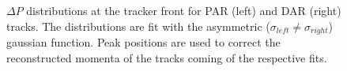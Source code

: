 \begin{figure}

\caption{
  \label{fig:sindrum_ii_fig_08_fit} 
  $\Delta P$ distributions at the tracker front for PAR (left) and DAR (right) tracks. The distributions  
  are fit with the asymmetric ($\sigma_{left} \ne \sigma_{right}$) gaussian function. Peak positions are used
  to correct the reconstructed  momenta of the tracks coming of the respective fits.
}
\end{figure}


